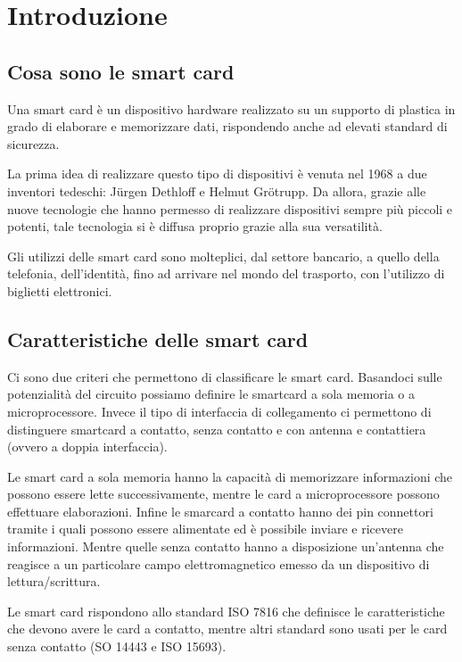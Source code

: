 \chapter{Introduzione}
\label{chapter1}

\section{Cosa sono le smart card}
Una smart card è un dispositivo hardware realizzato su un supporto di plastica in grado di elaborare e memorizzare dati, rispondendo anche ad elevati standard di sicurezza.

La prima idea di realizzare questo tipo di dispositivi è venuta nel 1968 a due inventori tedeschi: Jürgen Dethloff e Helmut Grötrupp. Da allora, grazie alle nuove tecnologie che hanno permesso di realizzare dispositivi sempre più piccoli e potenti, tale tecnologia si è diffusa proprio grazie alla sua versatilità.

Gli utilizzi delle smart card sono molteplici, dal settore bancario, a quello della telefonia, dell'identità, fino ad arrivare nel mondo del trasporto, con l'utilizzo di biglietti elettronici.
\cite{wiki_sc}

\section{Caratteristiche  delle smart card}

Ci sono due criteri che permettono di classificare le smart card. Basandoci sulle potenzialità del circuito possiamo definire le smartcard a sola memoria o a microprocessore. Invece il tipo di interfaccia di collegamento ci permettono di distinguere smartcard a contatto, senza contatto e con antenna e contattiera (ovvero a doppia interfaccia).

Le smart card a sola memoria hanno la capacità di memorizzare informazioni che possono essere lette successivamente, mentre le card a microprocessore possono effettuare elaborazioni. Infine le smarcard a contatto hanno dei pin connettori tramite i quali possono essere alimentate ed è possibile inviare e ricevere informazioni. Mentre quelle senza contatto hanno a disposizione un'antenna che reagisce a un particolare campo elettromagnetico emesso da un dispositivo di lettura/scrittura.

Le smart card rispondono allo standard ISO 7816 che definisce le caratteristiche che devono avere le card a contatto, mentre altri standard sono usati per le card senza contatto (SO 14443 e ISO 15693).

